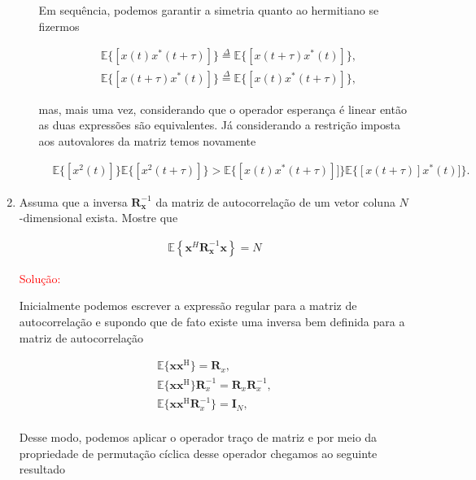 \documentclass[a4paper,10pt]{article}
\begin{document}
\begin{enumerate}
\begin{enumerate}
						
						Em sequência, podemos garantir a simetria quanto ao hermitiano se fizermos 
						
						\begin{align}
							&\mathbb{E}\{[x(t)x^{*}(t + \tau)]\} \overset{\Delta}{=} \mathbb{E}\{[x(t + \tau)x^{*}(t)]\}, \\
							&\mathbb{E}\{[x(t + \tau)x^{*}(t)]\} \overset{\Delta}{=} \mathbb{E}\{[x(t)x^{*}(t + \tau)]\},
						\end{align}
						
						mas, mais uma vez, considerando que o operador esperança é linear então as duas expressões são equivalentes. Já considerando a
						restrição imposta aos autovalores da matriz temos novamente
						
						\begin{align}
							&\mathbb{E}\{[x^{2}(t)]\} \mathbb{E}\{[x^{2}(t + \tau)]\} > \mathbb{E}\{[x(t)x^{*}(t + \tau)]]\}  \mathbb{E}\{[x(t + \tau)]x^{*}(t)]\}.
						\end{align}
					
				\end{enumerate}
			
			\item Assuma que a inversa $\mathbf{R}_{\mathbf{x}}^{-1}$ da matriz de autocorrelação de um vetor coluna $N$-dimensional exista. Mostre que
			
				\begin{align}
					\mathbb{E}\left\{\mathbf{x}^H \mathbf{R}_{\mathbf{x}}^{-1} \mathbf{x} \right\} = N
				\end{align}
				
				\textcolor{red}{Solução:}
				
				Inicialmente podemos escrever a expressão regular para a matriz de autocorrelação e supondo que de fato existe uma inversa bem definida 
				para a matriz de autocorrelação
				
				\begin{align}
					\mathbb{E}\{\mathbf{x} \mathbf{x}^{\text{H}}\} = \mathbf{R}_{x}, \\
					\mathbb{E}\{\mathbf{x} \mathbf{x}^{\text{H}}\}\mathbf{R}^{-1}_{x} = \mathbf{R}_{x}\mathbf{R}^{-1}_{x}, \\
					\mathbb{E}\{\mathbf{x} \mathbf{x}^{\text{H}}\mathbf{R}^{-1}_{x}\} = \mathbf{I}_{N}, \\
				\end{align}
				
				Desse modo, podemos aplicar o operador traço de matriz e por meio da propriedade de permutação cíclica desse operador chegamos ao seguinte resultado
				

\end{enumerate}
\end{document}
